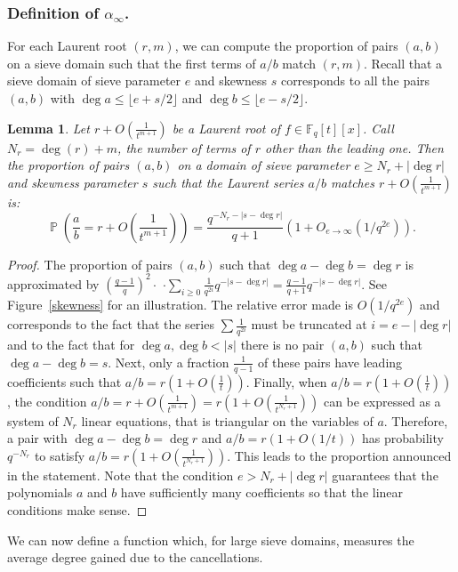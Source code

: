 \documentclass[a4wide]{article}
\newcommand{\F}{{\mathbb F}}
\DeclareMathOperator{\Prob}{\mathbb{P}}
\theoremstyle{plain}
\newtheorem{lem}[theo]{Lemma}
\theoremstyle{definition}
\theoremstyle{remark}
\begin{document}
\subsubsection{Definition of $\alpha_\infty$.}\label{sssec:alpha_infty}
For each Laurent root $(r,m)$, we can compute the proportion of pairs $(a,b)$ on a
sieve domain such that the first terms of $a/b$ match $(r,m)$. 
 Recall that a sieve domain of sieve parameter $e$ and skewness $s$ corresponds
 to all the pairs $(a,b)$ with $\deg a\leq\lfloor e+s/2\rfloor$ and $\deg b\leq
 \lfloor e-s/2 \rfloor$. 
 
 \begin{lem}\label{prob_r}
	Let $r+O(\frac{1}{t^{m+1}})$ be a Laurent root of $f\in\F_q[t][x]$. 
 Call $N_r=\deg(r)+m$, the number of terms of $r$ other than
the leading one.
Then the proportion of pairs $(a,b)$ on a domain of sieve parameter $e\geq
N_r+|\deg r|$ and
skewness parameter $s$ such that the Laurent series $a/b$
matches $r+O(\frac{1}{t^{m+1}})$ is:
\begin{equation*}
	\Prob
        \left(\frac{a}{b}=r+O\left(\frac{1}{t^{m+1}}\right)\right)
        =\frac {q^{-N_r-|s-\deg r|}} {q+1}
        (1+O_{e\rightarrow\infty}(1/q^{2e})).
\end{equation*}
\end{lem}
\begin{proof}
 The proportion of pairs $(a,b)$ such that $\deg a-\deg b=\deg r$ is
 approximated by $(\frac{q-1}{q})^2\cdot$ $\cdot\sum_{i\geq
0}\frac{1}{q^{2i}} q^{-|s-\deg r|}=$$\frac{q-1}{q+1}q^{-|s-\deg r|}$. See
Figure~\ref{skewness} for an illustration. The relative error made is
$O(1/q^{2e})$ and corresponds to the fact that the series
$\sum\frac{1}{q^{2i}}$ must be truncated at $i= e-|\deg r|$ and to the fact
that for $\deg a,\deg b< |s|$ there is no pair $(a,b)$ such that $\deg
a-\deg b=s$. Next, only a fraction $\frac{1}{q-1}$
of these pairs have leading coefficients such that $a/b=r(1+O(\frac{1}{t}))$. Finally, when
$a/b=r(1+O(\frac{1}{t}))$, the condition
$a/b=r+O(\frac{1}{t^{m+1}})=r(1+O(\frac{1}{t^{N_r+1}}))$ can be expressed as a
system of $N_r$ linear equations, that is triangular on the variables of $a$.
Therefore, a pair with $\deg a-\deg b=\deg r$ and $a/b=r(1+O(1/t))$ has
probability $q^{-N_r}$ to satisfy $a/b=r(1+O(\frac{1}{t^{N_r+1}}))$. This
leads to the proportion announced in the statement. Note that the condition
$e> N_r+|\deg r|$ guarantees that the polynomials $a$ and $b$ have
sufficiently many coefficients so that the linear conditions make sense.
\end{proof}
We can now define a function which, for large sieve domains, measures the
average degree gained due to the cancellations.
\end{document}
